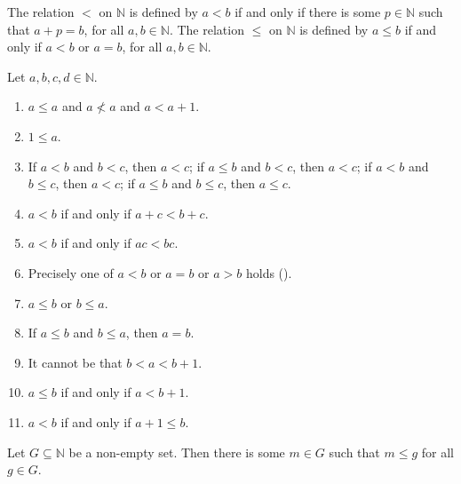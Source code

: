 \begin{definition} %
	\label{nat:d:relation}
	The relation $<$ on $\mathbb{N}$ is defined by $a < b$ if and only if there is some $p \in \mathbb{N}$ such that $a + p = b$, for all $a, b \in \mathbb{N}$. The relation $\leq$ on $\mathbb{N}$ is defined by $a \leq b$ if and only if $a < b$ or $a = b$, for all $a,b \in \mathbb{N}$.
\end{definition}

\begin{theorem} %
	\label{nat:t:relprops}
	Let $a, b, c, d \in \mathbb{N}$.
	\begin{enumerate}
		\item \label{nat:t:relprops:1}
		      $a \leq a$ and $a \nless a$ and $a < a + 1$.
		\item \label{nat:t:relprops:2}
		      $1 \leq a$.
		\item \label{nat:t:relprops:3}
		      If $a < b$ and $b < c$, then $a < c$; if $a \leq b$ and $b < c$, then $a < c$; if $a < b$ and $b \leq c$, then $a < c$; if $a \leq b$ and $b \leq c$, then $a \leq c$.
		\item \label{nat:t:relprops:4}
		      $a < b$ if and only if $a + c < b + c$.
		\item \label{nat:t:relprops:5}
		      $a < b$ if and only if $a c < b c$.
		\item {}
		      Precisely one of $a < b$ or $a = b$ or $a > b$ holds \quad ().
		\item \label{nat:t:relprops:7}
		      $a \leq b$ or $b \leq a$.
		\item \label{nat:t:relprops:8}
		      If $a \leq b$ and $b \leq a$, then $a = b$.
		\item \label{nat:t:relprops:9}
		      It cannot be that $b < a < b + 1$.
		\item \label{nat:t:relprops:10}
		      $a \leq b$ if and only if $a < b + 1$.
		\item \label{nat:t:relprops:11}
		      $a < b$ if and only if $a + 1 \leq b$.
	\end{enumerate}
\end{theorem}

\begin{theorem} %
	\label{nat:t:wop}
	Let $G \subseteq \mathbb{N}$ be a non-empty set. Then there is some $m \in G$ such that $m \leq g$ for all $g \in G$.
\end{theorem}

